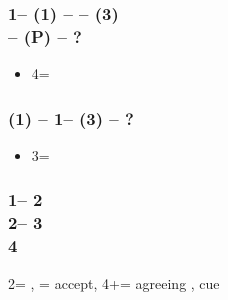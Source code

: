 \documentclass[12pt, a4paper]{article}
\begin{document}
\subsubsection*{1\diams -- (1\spades) -- \dbl -- (3\spades)\\
                \dbl -- (P) -- ?}
\begin{itemize}
    \item 4\minor = \forc
\end{itemize}

\subsubsection*{(1\diams) -- 1\spades -- (3\diams) -- ?}
\begin{itemize}
    \item 3\hearts = \nf
\end{itemize}

\subsubsection*{1\hearts -- 2\hearts\\
                2\nt -- 3\spades\\
                4\clubs}
2\nt = \invp, \spades = accept, 4+\clubs = agreeing \spades, cue
\end{document}
